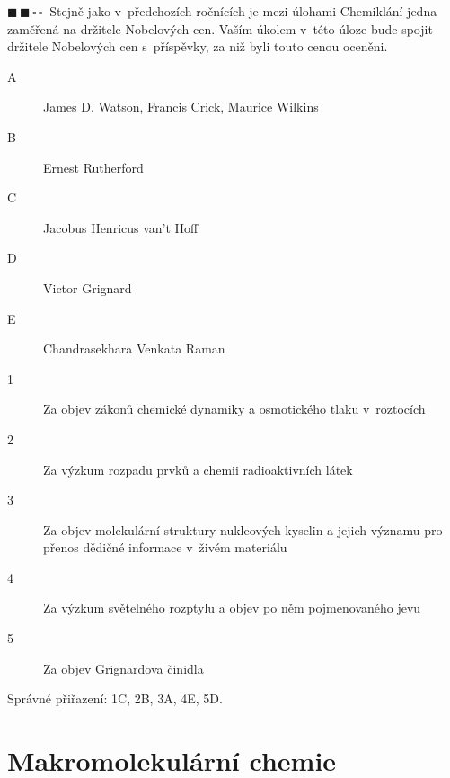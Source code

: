 \documentclass{book}
\newcommand{\dva}{$\blacksquare \, \blacksquare \, \square \, \square \; \; $}
\renewenvironment{quotation}{\par}{\par} %
\begin{document}
\hrulefill %
\begin{quotation}
\dva Stejně jako v~předchozích ročnících je mezi úlohami Chemiklání jedna
zaměřená na držitele Nobelových cen. Vaším úkolem v~této úloze bude
spojit držitele Nobelových cen s~příspěvky, za niž byli touto cenou
oceněni. 
\begin{description}
\item [{A}] James D. Watson, Francis Crick, Maurice Wilkins
\item [{B}] Ernest Rutherford
\item [{C}] Jacobus Henricus van't Hoff
\item [{D}] Victor Grignard 
\item [{E}] Chandrasekhara Venkata Raman 
\newpage %
\item [{1}] Za objev zákonů chemické dynamiky a osmotického tlaku v~roztocích
\item [{2}] Za výzkum rozpadu prvků a chemii radioaktivních látek
\item [{3}] Za objev molekulární struktury nukleových kyselin a jejich
významu pro přenos dědičné informace v~živém materiálu 
\item [{4}] Za výzkum světelného rozptylu a objev po něm pojmenovaného
jevu
\item [{5}] Za objev Grignardova činidla 
\end{description}
\end{quotation} \dotfill \par 
Správné přiřazení: 1C, 2B, 3A, 4E, 5D.


\section{Makromolekulární chemie}
\end{document}
